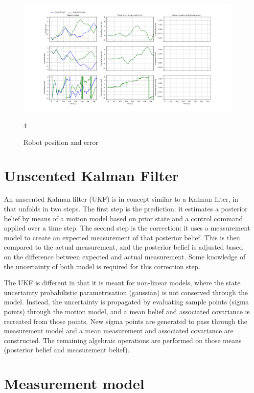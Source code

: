 \documentclass{article}
\begin{document}
\begin{figure}
\centering
\includegraphics[width=\textwidth]{Figure_3.png}
\caption{Robot position and error}4
\label{fig:figure3}
\end{figure}

\section{Unscented Kalman Filter}

An unscented Kalman filter (UKF) is in concept similar to a Kalman filter, in that unfolds in two steps. The first step is the prediction: it estimates a posterior belief by means of a motion model based on prior state and a control command applied over a time step. The second step is the correction: it uses a measurement model to create an expected measurement of that posterior belief. This is then compared to the actual measurement, and the posterior belief is adjusted based on the difference between expected and actual measurement. Some knowledge of the uncertainty of both model is required for this correction step.

The UKF is different in that it is meant for non-linear models, where the state uncertainty probabilistic parametrisation (gaussian) is not conserved through the model. Instead, the uncertainty is propagated by evaluating sample points (sigma points) through the motion model, and a mean belief and associated covariance is recreated from those points. New sigma points are generated to pass through the measurement model and a mean measurement and associated covariance are constructed. 
The remaining algebraic operations are performed on those means (posterior belief and measurement belief).


\section{Measurement model}
\end{document}
